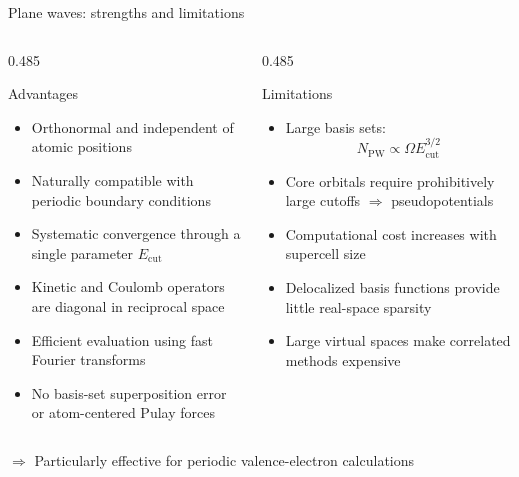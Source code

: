 \documentclass[aspectratio=169,9pt]{beamer}
\newcommand{\red}[1]{\textcolor{hfRed}{#1}}
\newcommand{\green}[1]{\textcolor{hfGreen}{#1}}
\newcommand{\cmark}{\textbf{\green{\ding{51}}}}
\newcommand{\xmark}{\textbf{\red{\ding{55}}}}
\begin{document}
\begin{frame}{Plane waves: strengths and limitations}
	\begin{center}
	\end{center}

	\begin{columns}[T,onlytextwidth]
		\begin{column}{0.485\textwidth}
			\begin{block}{Advantages}
				\begin{itemize}
					\item[$\cmark$] Orthonormal and independent of atomic positions
					\item[$\cmark$] Naturally compatible with periodic boundary conditions
					\item[$\cmark$] Systematic convergence through a single parameter
					      $E_{\mathrm{cut}}$
					\item[$\cmark$] Kinetic and Coulomb operators are diagonal in
					      reciprocal space
					\item[$\cmark$] Efficient evaluation using fast Fourier transforms
					\item[$\cmark$] No basis-set superposition error or
					      atom-centered Pulay forces
				\end{itemize}
			\end{block}
		\end{column}
		\begin{column}{0.485\textwidth}
			\begin{block}{Limitations}
				\begin{itemize}
					\item[$\xmark$] Large basis sets:
					$$N_{\text{PW}} \propto \Omega E_{\text{cut}}^{3/2}$$
					\item[$\xmark$] Core orbitals require prohibitively large cutoffs
					      $\Rightarrow$ pseudopotentials
					\item[$\xmark$] Computational cost increases with supercell size
					\item[$\xmark$] Delocalized basis functions provide little
					      real-space sparsity
					\item[$\xmark$] Large virtual spaces make 
					      correlated methods expensive
				\end{itemize}
			\end{block}
		\end{column}
	\end{columns}
	\vfill
	\centering
	$\Rightarrow$ \alert{Particularly effective for periodic valence-electron calculations}
\end{frame}
\end{document}
